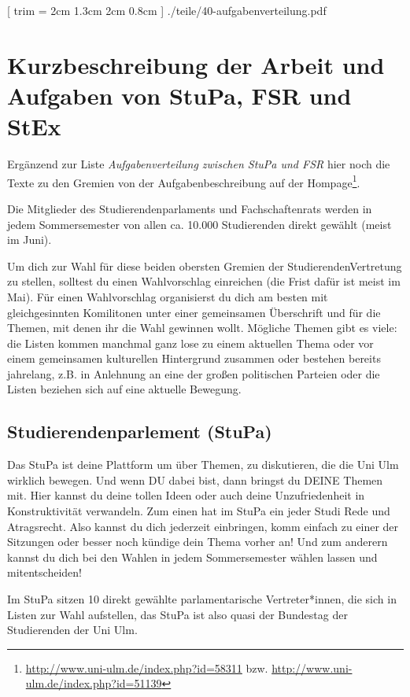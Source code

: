 \documentclass[
	10pt,
	a5paper,
	twoside
	]
	{book}
\begin{document}


[
trim = 2cm 1.3cm 2cm 0.8cm
]
{./teile/40-aufgabenverteilung.pdf}

\section{Kurzbeschreibung der Arbeit und Aufgaben von StuPa, FSR und StEx}

Ergänzend zur Liste \textit{Aufgabenverteilung zwischen StuPa und FSR} hier noch die Texte zu den Gremien von der Aufgabenbeschreibung auf der Hompage\footnote{\url{http://www.uni-ulm.de/index.php?id=58311} bzw. \url{http://www.uni-ulm.de/index.php?id=51139}}.

Die Mitglieder des Studierendenparlaments und Fachschaftenrats werden in jedem Sommersemester von allen ca. 10.000 Studierenden direkt gewählt (meist im Juni).

Um dich zur Wahl für diese beiden obersten Gremien der StudierendenVertretung zu stellen, solltest du einen Wahlvorschlag einreichen (die Frist dafür ist meist im Mai). Für einen Wahlvorschlag organisierst du dich am besten mit gleichgesinnten Komilitonen unter einer gemeinsamen Überschrift und für die Themen, mit denen ihr die Wahl gewinnen wollt. Mögliche Themen gibt es viele: die Listen kommen manchmal ganz lose zu einem aktuellen Thema oder vor einem gemeinsamen kulturellen Hintergrund zusammen oder bestehen bereits jahrelang, z.B. in Anlehnung an eine der großen politischen Parteien oder die Listen beziehen sich auf eine aktuelle Bewegung.


\subsection{Studierendenparlement (StuPa)}

Das StuPa ist deine Plattform um über Themen, zu diskutieren, die die Uni Ulm wirklich bewegen. Und wenn DU dabei bist, dann bringst du DEINE Themen mit. Hier kannst du deine tollen Ideen oder auch deine Unzufriedenheit in Konstruktivität verwandeln. Zum einen hat im StuPa ein jeder Studi Rede und Atragsrecht. Also kannst du dich jederzeit einbringen, komm einfach zu einer der Sitzungen  oder besser noch kündige dein Thema vorher an! Und zum anderern kannst du dich bei den Wahlen in jedem Sommersemester wählen lassen und mitentscheiden!

Im StuPa sitzen 10 direkt gewählte parlamentarische Vertreter*innen, die sich in Listen zur Wahl aufstellen, das StuPa ist also quasi der Bundestag der Studierenden der Uni Ulm. 
\end{document}
